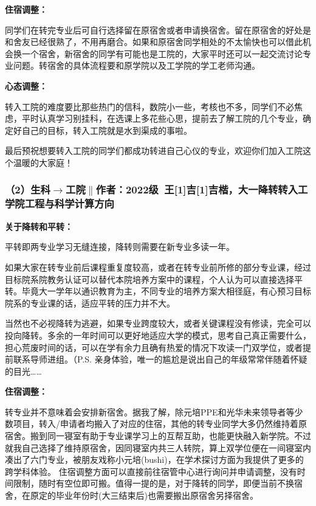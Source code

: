 \documentclass[11pt,oneside]{book}
\begin{document}
\textbf{\textbf{住宿调整}}\textbf{\textbf{：}}

同学们在转完专业后可自行选择留在原宿舍或者申请换宿舍。留在原宿舍的好处是和舍友已经很熟了，不用再磨合。如果和原宿舍同学相处的不太愉快也可以借此机会换一个宿舍，新宿舍的同学有可能也是工院的，大家平时还可以一起交流讨论专业问题。转宿舍的具体流程要和原学院以及工学院的学工老师沟通。

\textbf{\textbf{心态调整}}\textbf{\textbf{：}}

转入工院的难度要比那些热门的信科，数院小一些，考核也不多，同学们不必焦虑，平时认真学习别挂科，在选课上多花些心思，提前去了解工院的几个专业，确定好自己的目标，转入工院就是水到渠成的事啦。

最后预祝想要转入工院的同学们都成功转进自己心仪的专业，欢迎你们加入工院这个温暖的大家庭！

\subsubsection{（2）生科$\to$工院$\parallel$作者：2022级\ 王\hbox{\scalebox{0.6}[1]{吉}\kern-2pt\scalebox{0.6}[1]{吉}}楷，大一降转转入工学院工程与科学计算方向}
\textbf{\textbf{关于降转和平转}}\textbf{\textbf{：}}

平转即两专业学习无缝连接，降转则需要在新专业多读一年。

如果大家在转专业前后课程重复度较高，或者在转专业前所修的部分专业课，经过目标院系院教务认证可以替代本院培养方案中的课程，个人认为可以直接选择平转。毕竟大一学年以通识教育为主，不同专业的培养方案大相径庭，有心预习目标院系的专业课的话，适应平转的压力并不大。

当然也不必视降转为逃避，如果专业跨度较大，或者关键课程没有修读，完全可以投向降转。多余的一年时间可以更好地适应大学的模式，思考自己真正需要什么，担心荒废时间的话，可以在学有余力且确有热爱的情况下攻读一门双学位，或者提前联系导师进组。（P.S. 亲身体验，唯一的尴尬是说出自己的年级常常伴随着怀疑的目光……

\textbf{\textbf{住宿调整}}\textbf{\textbf{：}}

转专业并不意味着会安排新宿舍。据我了解，除元培PPE和光华未来领导者等少数项目，转入/申请者均搬入了对应的住宿，其他的转专业同学大多仍然维持着原宿舍。搬到同一寝室有助于专业课学习上的互帮互助，也能更快融入新学院。不过就我自己选择了维持原宿舍，因同寝室内共三人转院，算上双学位便在一间寝室内凑出了六门专业，被朋友戏称小元培(bushi)，在学术探讨方面为我提供了更多的跨学科体验。
住宿调整方面可以直接前往宿管中心进行询问并申请调整，没有时间限制，随时有空位即可搬。值得一提的是，对于降转的同学，即便当前不换宿舍，在原定的毕业年份时(大三结束后)也需要搬出原宿舍另择宿舍。
\end{document}
